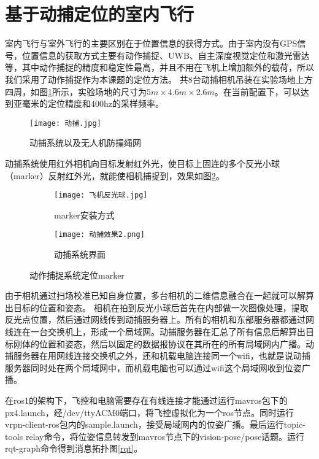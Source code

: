   \section{基于动捕定位的室内飞行}
室内飞行与室外飞行的主要区别在于位置信息的获得方式。由于室内没有GPS信号，位置信息的获取方式主要有动作捕捉、UWB、自主深度视觉定位和激光雷达等，其中动作捕捉的精度和稳定性最高，并且不用在飞机上增加额外的载荷，所以我们采用了动作捕捉作为本课题的定位方法。
共8台动捕相机吊装在实验场地上方四周，如图\ref{动捕}所示，实验场地的尺寸为$5m \times 4.6m \times 2.6m$。在当前配置下，可以达到亚毫米的定位精度和400hz的采样频率\cite{qingtong}。
\begin{figure}[!h]
  \centering
  \texttt{[image: 动捕.jpg]}
  \caption{动捕系统以及无人机防撞绳网}
  \label{动捕}
\end{figure}
动捕系统使用红外相机向目标发射红外光，使目标上固连的多个反光小球（marker）反射红外光，就能使相机捕捉到，效果如图\ref{反光小球}。


\begin{figure}[h]
  \centering
  \begin{subfigure}[c]{0.4\textwidth}
    \centering
    \texttt{[image: 飞机反光球.jpg]}
    \caption{marker安装方式}
  \end{subfigure}\hfill
    \begin{subfigure}[c]{0.55\textwidth}
      \centering
      \texttt{[image: 动捕效果2.png]}
      \caption{动捕系统界面}
  \end{subfigure}
  \caption{动作捕捉系统定位marker}
  \label{反光小球}
  \end{figure}


由于相机通过扫场校准已知自身位置，多台相机的二维信息融合在一起就可以解算出目标的位置和姿态。
相机在拍到反光小球后首先在内部做一次图像处理，提取反光点位置，然后通过网线传到动捕服务器上。所有的相机和东部服务器都通过网线连在一台交换机上，形成一个局域网。动捕服务器在汇总了所有信息后解算出目标刚体的位置和姿态，然后以固定的数据报协议在其所在的所有局域网内广播。动捕服务器在用网线连接交换机之外，还和机载电脑连接同一个wifi，也就是说动捕服务器同时处在两个局域网中，而机载电脑也可以通过wifi这个局域网收到位姿广播。

在ros1的架构下，飞控和电脑需要存在有线连接才能通过运行mavros包下的px4.launch，经/dev/ttyACM0端口，将飞控虚拟化为一个ros节点。同时运行vrpn-client-ros包内的sample.launch，接受局域网内的位姿广播。最后运行topic-tools relay命令，将位姿信息转发到mavros节点下的vision-pose/pose话题。运行rqt-graph命令得到消息拓扑图\ref{rqt}。

